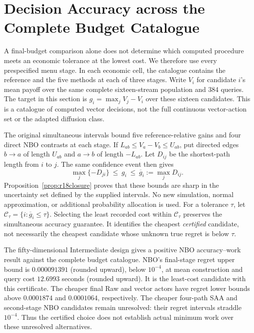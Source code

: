 \section{Decision Accuracy across the Complete Budget Catalogue}\label{sec:r18catalogue}
A final-budget comparison alone does not determine which computed procedure
meets an economic tolerance at the lowest cost. We therefore use every
prespecified menu stage. In each economic cell, the catalogue contains the
reference and the five methods at each of three stages. Write $V_i$ for
candidate $i$'s mean payoff over the same complete sixteen-stream population
and 384 queries. The target in this section is
$g_i=\max_j V_j-V_i$ over these sixteen candidates. This is a catalogue of
computed vector decisions, not the full continuous vector-action set or the
adapted diffusion class.

The original simultaneous intervals bound five reference-relative gains and
four direct NBO contrasts at each stage. If $L_{ab}\leq V_a-V_b\leq U_{ab}$,
put directed edges $b\to a$ of length $U_{ab}$ and $a\to b$ of length
$-L_{ab}$. Let $D_{ij}$ be the shortest-path length from $i$ to $j$.
The same confidence event then gives
\begin{equation}\label{eq:r18cataloguegap}
 \max_j\{-D_{ji}\}\ \leq\ g_i\ \leq\ \overline g_i:=\max_j D_{ij}.
\end{equation}
Proposition~\ref{prop:r18closure} proves that these bounds are sharp in the
uncertainty set defined by the supplied intervals. No new simulation,
normal approximation, or additional probability allocation is used.
For a tolerance $\tau$, let $\mathcal C_\tau=\{i:\overline g_i\leq\tau\}$.
Selecting the least recorded cost within $\mathcal C_\tau$ preserves the
simultaneous accuracy guarantee. It identifies the cheapest \emph{certified}
candidate, not necessarily the cheapest candidate whose unknown true regret
is below $\tau$.



The fifty-dimensional Intermediate design gives a positive NBO accuracy--work
result against the complete budget catalogue. NBO's final-stage regret upper
bound is $0.000091391$ (rounded upward), below $10^{-4}$, at mean construction
and query cost $12.6993$ seconds (rounded upward). It is the least-cost
candidate with this certificate. The cheaper final Raw and vector actors
have regret lower bounds above $0.0001874$ and $0.0001064$, respectively.
The cheaper four-path SAA and second-stage NBO candidates remain unresolved:
their regret intervals straddle $10^{-4}$. Thus the certified choice does
not establish actual minimum work over these unresolved alternatives.

